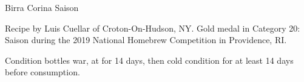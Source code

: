 \begin{recipe}{Birra Corina Saison}

\begin{aboutblock}
Recipe by Luis Cuellar of Croton-On-Hudson, NY. Gold medal in Category 20:
Saison during the 2019 National Homebrew Competition in Providence, RI.
\sourceaha
\end{aboutblock}


\begin{methodandtiming}
 
\begin{mashsteps}
\end{mashsteps}

\begin{fermentationsteps}
\end{fermentationsteps}

\begin{directions}
Condition bottles war, at  for 14 days, then cold condition for at
least 14 days before consumption.
\end{directions}

\end{methodandtiming}

\recipebreak

\begin{ingredientsblock}

\begin{malts}
\end{malts}

\begin{hops}
\end{hops}


\end{ingredientsblock}

\end{recipe}

